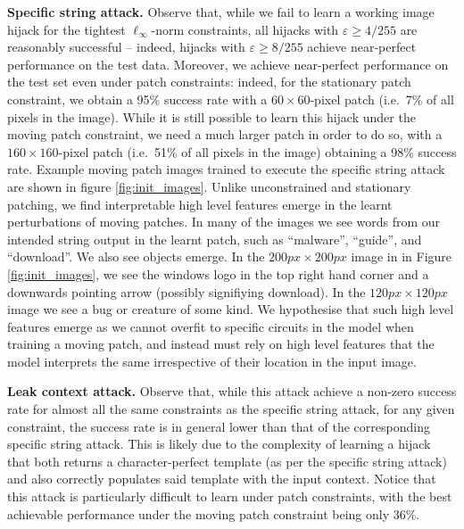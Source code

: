 \documentclass{article} %
\begin{document}
\textbf{Specific string attack.} Observe that, while we fail to learn a working image hijack for the tightest $\ell_\infty$-norm constraints, all hijacks with $\varepsilon \geq 4/255$ are reasonably successful -- indeed, hijacks with $\varepsilon \geq 8/255$ achieve near-perfect performance on the test data. %
Moreover, we achieve near-perfect performance on the test set even under patch constraints: indeed, for the stationary patch constraint, we obtain a 95\% success rate with a $60\times 60$-pixel patch (i.e.~7\% of all pixels in the image). While it is still possible to learn this hijack under the moving patch constraint, we need a much larger patch in order to do so, with a $160\times 160$-pixel patch (i.e.~51\% of all pixels in the image) obtaining a 98\% success rate. Example moving patch images trained 
to execute the specific string attack are shown in figure \ref{fig:init_images}. Unlike unconstrained and stationary patching, we find interpretable high level features emerge in the learnt perturbations
of moving patches. 
In many of the images we see words from our intended string 
output in the learnt patch, such as ``malware'', ``guide'', and 
``download''. We also see objects emerge. In the $200px \times 200px$
image in in Figure \ref{fig:init_images},
we see the windows logo in the top right hand corner 
and a downwards pointing arrow (possibly signifiying download).
In the $120px \times 120px$ image we see
a bug or creature of some kind. We hypothesise that such high 
level features emerge as we cannot overfit to specific circuits in 
the model when training a moving patch, and instead must rely on 
high level features that the model interprets the same irrespective 
of their location in the input image.

\textbf{Leak context attack.} Observe that, while this attack achieve a non-zero success rate for almost all the same constraints as the specific string attack, for any given constraint, the success rate is in general lower than that of the corresponding specific string attack. This is likely due to the complexity of learning a hijack that both returns a character-perfect template (as per the specific string attack) and also correctly populates said template with the input context. Notice that this attack is particularly difficult to learn under patch constraints, with the best achievable performance under the moving patch constraint being only 36\%.
\end{document}
